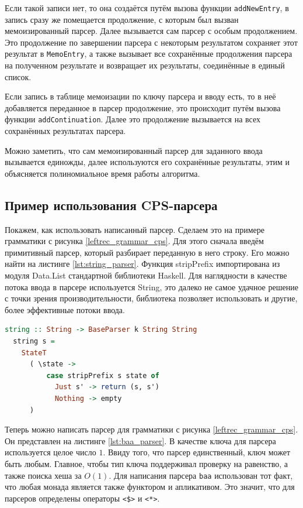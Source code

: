\documentclass[times]{itmo-student-thesis}
\begin{document}
Если такой записи нет, то она создаётся путём вызова функции \lstinline{addNewEntry}, в запись сразу же помещается продолжение, с
которым был вызван мемоизированный парсер. Далее вызывается сам парсер с особым продолжением. Это продолжение
по завершении парсера с некоторым результатом сохраняет этот результат в \lstinline{MemoEntry}, а также вызывает все
сохранённые продолжения парсера на полученном результате и возвращает их результаты, соединённые в единый список.

Если запись в таблице мемоизации по ключу парсера и вводу есть, то в неё добавляется переданное в парсер продолжение, это происходит
путём вызова функции \lstinline{addContinuation}. Далее это продолжение вызывается на всех сохранённых результатах парсера.

Можно заметить, что сам мемоизированный парсер для заданного ввода вызывается единожды, далее используются его
сохранённые результаты, этим и объясняется полиномиальное время работы алгоритма.

\subsection{Пример использования CPS-парсера}\label{sec:cps_parser_example}

Покажем, как использовать написанный парсер. Сделаем это на примере грамматики с рисунка \ref{leftrec_grammar_cps}.
Для этого сначала введём примитивный парсер, который разбирает переданную в него строку. Его можно найти на листинге
\ref{lst:string_parser}. Функция stripPrefix импортирована из модуля Data.List стандартной библиотеки Haskell. Для
наглядности в качестве потока ввода в парсере используется String,  это далеко не самое удачное решение с точки зрения
производительности, библиотека позволяет использовать и другие, более эффективные потоки ввода.

\begin{lstlisting}[language=Haskell,float=!h,caption={Парсер для строки},label={lst:string_parser}]
  string :: String -> BaseParser k String String
  string s =
    StateT
      ( \state ->
          case stripPrefix s state of
            Just s' -> return (s, s')
            Nothing -> empty
      )
\end{lstlisting}

Теперь можно написать парсер для грамматики с рисунка \ref{leftrec_grammar_cps}. Он представлен на листинге
\ref{lst:baa_parser}.	В качестве ключа для парсера используется целое число $1$. Ввиду того, что
парсер единственный, ключ может быть любым. Главное, чтобы тип ключа поддерживал проверку на равенство, а также поиска
хеша за $O(1)$. Для написания парсера \lstinline{baa} использован тот факт, что любая монада
является также функтором и апликативом. Это значит, что для парсеров определены операторы
\lstinline{<$>} и \lstinline{<*>}.
\end{document}
